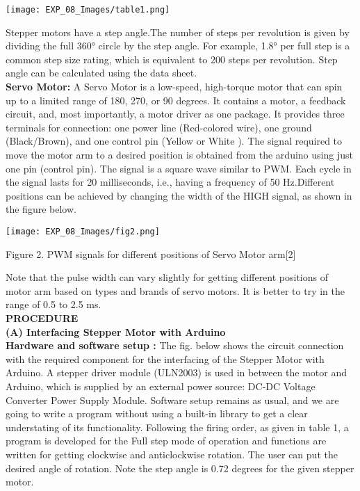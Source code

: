 \documentclass[12pt,a4paper]{article}
\begin{document}
\begin{justify}
\begin{center} 
\texttt{[image: EXP\_08\_Images/table1.png]}
\end{center}
Stepper motors have a step angle.The number of steps per revolution is given by dividing the full 360° 
circle by the step angle. For example, 1.8° per full step is a common step size rating, which is 
equivalent to 200 steps per revolution. Step angle can be calculated using the data sheet. \\
\textbf{Servo Motor:} A Servo Motor is a low-speed, high-torque motor that can spin up to a limited range 
of 180, 270, or 90 degrees. It contains a motor, a feedback circuit, and, most importantly, a motor 
driver as one package. It provides three terminals for connection: one power line (Red-colored wire), 
one ground (Black/Brown), and one control pin (Yellow or White ). The signal required to move the 
motor arm to a desired position is obtained from the arduino using just one pin (control pin). The 
signal is a square wave similar to PWM. Each cycle in the signal lasts for 20 milliseconds, i.e., having 
a frequency of 50 Hz.Different positions can be achieved by changing the width of the HIGH signal, as shown in the figure 
below.


\begin{center} 
\texttt{[image: EXP\_08\_Images/fig2.png]}
\end{center}

\begin{center}Figure 2. PWM signals for different positions of Servo Motor arm[2]\end{center}
\vspace{-5mm}
Note that the pulse width can vary slightly for getting different positions of motor arm based on types and brands of servo motors. It is better to try in the range of 0.5 to 2.5 ms.\\[21pt]\textbf{\large PROCEDURE}\\[3pt]
\textbf{(A)	Interfacing Stepper Motor with Arduino}\\[3pt]
\textbf{Hardware and software setup :} The fig. below shows the circuit connection with the required component for the interfacing of the Stepper Motor with Arduino. A stepper driver module (ULN2003) is used in between the motor and Arduino, which is supplied by an external power source: DC-DC Voltage Converter Power Supply Module. Software setup remains as usual, and we are going to write a program without using a built-in library to get a clear understating of its functionality. Following the firing order, as given in table 1, a program is developed for the Full step mode of operation and functions are written for getting clockwise and anticlockwise rotation. The user can put the desired angle of rotation. Note the step angle is 0.72 degrees for the given stepper motor.\end{justify}
\end{document}
